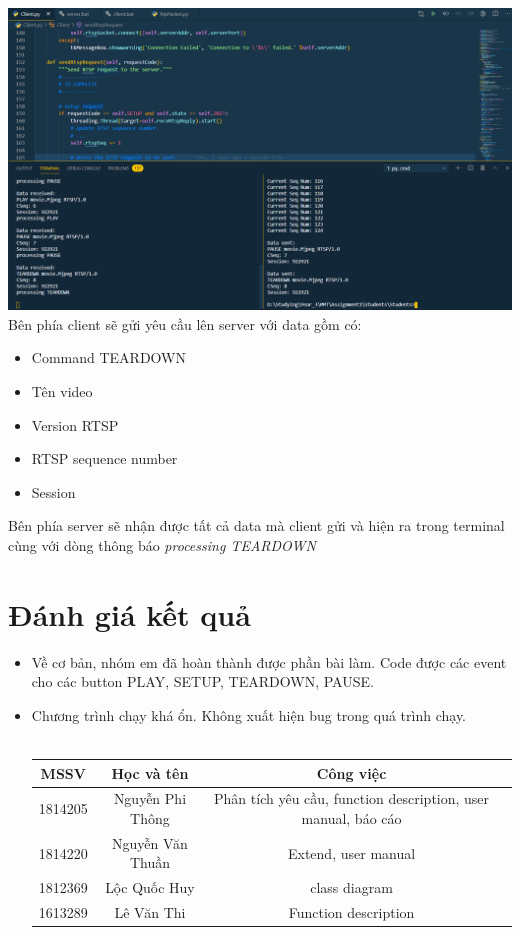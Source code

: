 \documentclass[12pt,a4paper]{article}
\begin{document}
\begin{enumerate}
\includegraphics[scale=0.5]{h5.png}  \\
Bên phía client sẽ gửi yêu cầu lên server với data gồm có:
\begin{itemize}
\item Command TEARDOWN
\item Tên video
\item Version RTSP
\item RTSP sequence number
\item Session 
\end{itemize}
Bên phía server sẽ nhận được tất cả data mà client gửi và hiện ra trong terminal cùng với dòng thông báo  \textit{processing TEARDOWN}
\end{enumerate}

\section{Đánh giá kết quả}
\begin{itemize}
\item Về cơ bản, nhóm em đã hoàn thành được phần bài làm. Code được các event cho các button PLAY, SETUP, TEARDOWN, PAUSE.
\item Chương trình chạy khá ổn. Không xuất hiện bug trong quá trình chạy. \\ \\
\begin{tabular}{|c|c|c|c|}
\hline 
MSSV&Học và tên & Công việc\\
\hline 
1814205&Nguyễn Phi Thông&Phân tích yêu cầu, function description, user manual, báo cáo \\
\hline 
1814220&Nguyễn Văn Thuần&Extend, user manual\\
\hline
1812369&Lộc Quốc Huy&class diagram\\
\hline
1613289&Lê Văn Thi&Function description\\
\hline
\end{tabular}
\end{itemize}
\end{document}
